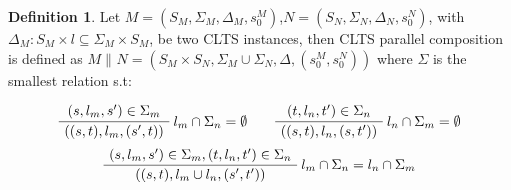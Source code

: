 \documentclass{article}
\theoremstyle{definition}
\newtheorem{definition}{Definition}[section]
\newcommand{\automaton}[1]{$#1 = (S_{#1}, \Sigma_{#1}, \Delta_{#1}, s_{0}^{#1})$}
\newcommand{\ltsComposition}[3]{$#1 \parallel_{#3} #2 = (S_{#1}\times S_{#2}, \Sigma_{#1} \cup \Sigma_{#2}, \Delta, (s_{0}^{#1},s_{0}^{#2}))$}
\begin{document}
\begin{definition} 
	Let \automaton{M},\automaton{N}, with $\Delta_M : S_M \times l \subseteq \Sigma_M \times S_M$, be two CLTS instances, then CLTS parallel composition is defined as \ltsComposition{M}{N}{} where $\Sigma$ is the smallest relation s.t:
	\begin{center}
		\begin{equation}
			\AxiomC{$(s, l_m, s') \in \Sigma_m $}\RightLabel{$l_m \cap \Sigma_n = \emptyset$}
			\UnaryInfC{$((s,t),l_m,(s',t))$}
			\DisplayProof
			\quad\quad
			\AxiomC{$(t, l_n, t') \in \Sigma_n $}\RightLabel{$l_n \cap \Sigma_m = \emptyset$}
			\UnaryInfC{$((s,t),l_n,(s,t'))$}
			\DisplayProof
		\end{equation}		
		\begin{equation}
		\AxiomC{$(s, l_m, s') \in \Sigma_m,(t, l_n, t') \in \Sigma_n  $}\RightLabel{$l_m \cap \Sigma_n = l_n \cap \Sigma_m$}
		\UnaryInfC{$((s,t),l_m \cup l_n,(s',t'))$}
		\DisplayProof
		\end{equation}	
	\end{center}
\end{definition}
\end{document}
